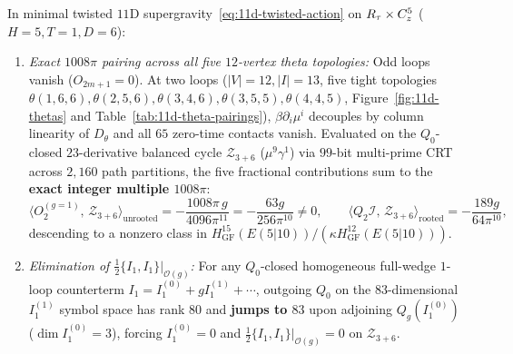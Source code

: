 \begin{theorem}
\label{thm:11d-obstruction}
In minimal twisted $11\mathrm{D}$ supergravity~\eqref{eq:11d-twisted-action} on $R_\tau\times C^5_z$ ($H=5, T=1, D=6$):
\begin{enumerate}[label=(\arabic*),leftmargin=*]
  \item \emph{Exact $1008\pi$ pairing across all five $12$-vertex theta topologies:} Odd loops vanish ($O_{2m+1}=0$). At two loops ($|V|=12, |I|=13$, five tight topologies $\theta(1,6,6), \theta(2,5,6), \theta(3,4,6), \theta(3,5,5), \theta(4,4,5)$, Figure~\ref{fig:11d-thetas} and Table~\ref{tab:11d-theta-pairings}), $\beta\partial_i\mu^i$ decouples by column linearity of $D_\theta$ and all $65$ zero-time contacts vanish. Evaluated on the $Q_0$-closed $23$-derivative balanced cycle $\mathcal{Z}_{3+6}$ ($\mu^9\gamma^1$) via $99$-bit multi-prime CRT across $2{,}160$ path partitions, the five fractional contributions sum to the \textbf{exact integer multiple $1008\pi$}:
  \begin{equation}
  \label{eq:11d-63-pairing}
  \bigl\langle O_2^{(g=1)},\, \mathcal{Z}_{3+6}\bigr\rangle_{\mathrm{unrooted}} = -\frac{1008\pi\,g}{4096\pi^{11}} = -\frac{63g}{256\pi^{10}} \neq 0,\qquad
  \bigl\langle Q_2\mathcal{I},\, \mathcal{Z}_{3+6}\bigr\rangle_{\mathrm{rooted}} = -\frac{189g}{64\pi^{10}},
  \end{equation}
  descending to a nonzero class in $H^{15}_{\mathrm{GF}}(E(5|10))/(\kappa H^{12}_{\mathrm{GF}}(E(5|10)))$.

  \item \emph{Elimination of $\frac{1}{2}\{I_1,I_1\}|_{\mathcal{O}(g)}$:} For any $Q_0$-closed homogeneous full-wedge $1$-loop counterterm $I_1 = I_1^{(0)} + g I_1^{(1)} + \cdots$, outgoing $Q_0$ on the $83$-dimensional $I_1^{(1)}$ symbol space has rank $80$ and \textbf{jumps to $83$} upon adjoining $Q_g(I_1^{(0)})$ ($\dim I_1^{(0)} = 3$), forcing $I_1^{(0)} = 0$ and $\frac{1}{2}\{I_1,I_1\}|_{\mathcal{O}(g)} = 0$ on $\mathcal{Z}_{3+6}$.


\end{enumerate}
\end{theorem}
